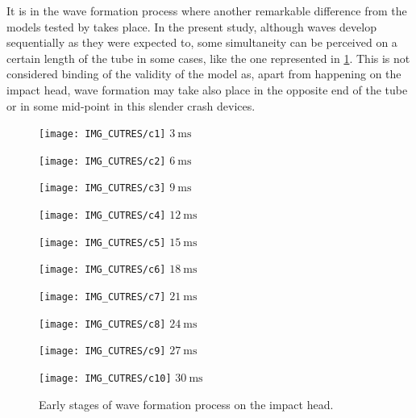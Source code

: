 \documentclass[cmfonts]{witpress}
\begin{document}
It is in the wave formation process where another remarkable difference from the models tested by \cite{Scattina2011} takes place. In the present study, although waves develop sequentially as they were expected to, some simultaneity can be perceived on a certain length of the tube in some cases, like the one represented in \cref{fig:wave_form}. This is not considered binding of the validity of the model as, apart from happening on the impact head, wave formation may take also place in the opposite end of the tube or in some mid-point \cite{Abedrabbo2009, Costas2013} in this slender crash devices.

\begin{figure}
	\centering
	\begin{minipage}[b]{.15\linewidth}
		\centering
		\texttt{[image: IMG\_CUTRES/c1]}
		$\SI{3}{\ms}$
	\end{minipage}
	\quad
	\begin{minipage}[b]{.15\linewidth}
		\centering
		\texttt{[image: IMG\_CUTRES/c2]}
		$\SI{6}{\ms}$
	\end{minipage}
	\quad
	\begin{minipage}[b]{.15\linewidth}
		\centering
		\texttt{[image: IMG\_CUTRES/c3]}
		$\SI{9}{\ms}$
	\end{minipage}
	\quad
	\begin{minipage}[b]{.15\linewidth}
		\centering
		\texttt{[image: IMG\_CUTRES/c4]}
		$\SI{12}{\ms}$
	\end{minipage}
	\quad
	\begin{minipage}[b]{.15\linewidth}
		\centering
		\texttt{[image: IMG\_CUTRES/c5]}
		$\SI{15}{\ms}$
	\end{minipage}
	\quad
	\begin{minipage}[b]{.15\linewidth}
		\centering
		\texttt{[image: IMG\_CUTRES/c6]}
		$\SI{18}{\ms}$
	\end{minipage}
	\quad
	\begin{minipage}[b]{.15\linewidth}
		\centering
		\texttt{[image: IMG\_CUTRES/c7]}
		$\SI{21}{\ms}$
	\end{minipage}
	\quad
	\begin{minipage}[b]{.15\linewidth}
		\centering
		\texttt{[image: IMG\_CUTRES/c8]}
		$\SI{24}{\ms}$
	\end{minipage}
	\quad
	\begin{minipage}[b]{.15\linewidth}
		\centering
		\texttt{[image: IMG\_CUTRES/c9]}
		$\SI{27}{\ms}$
	\end{minipage}
	\quad
	\begin{minipage}[b]{.15\linewidth}
		\centering
		\texttt{[image: IMG\_CUTRES/c10]}
		$\SI{30}{\ms}$
	\end{minipage}
\caption{Early stages of wave formation process on the impact head.}
\label{fig:wave_form}
\end{figure}
\end{document}
